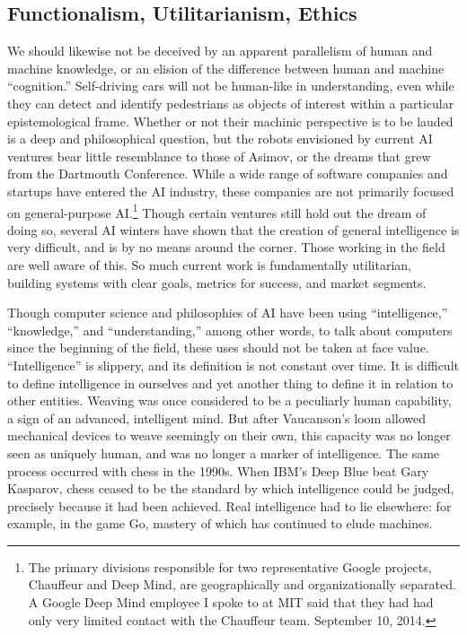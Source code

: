 \subsection{Functionalism, Utilitarianism, Ethics} 
We should likewise not be deceived by an apparent parallelism of human
and machine knowledge, or an elision of the difference between human
and machine ``cognition.'' Self-driving cars will not be human-like in
understanding, even while they can detect and identify pedestrians as
objects of interest within a particular epistemological frame. Whether
or not their machinic perspective is to be lauded is a deep and
philosophical question, but the robots envisioned by current AI
ventures bear little resemblance to those of Asimov, or the dreams that grew
from the Dartmouth Conference. While a wide range of software companies and
startups have entered the AI 
industry, these companies are not primarily focused on
general-purpose AI.\footnote{The primary divisions responsible for two
representative Google projects, Chauffeur and Deep Mind, are
geographically and organizationally separated. A Google Deep Mind
employee I spoke to at MIT said that they had had only very limited
contact with the Chauffeur team. September 10, 2014.} Though certain
ventures still hold out the dream 
of doing so, several AI winters have shown that the creation of
general intelligence is very difficult, and is by no means around the
corner. Those working in the field are well aware of
this.\cite{???-articlerebuttingmusk-http://www.popsci.com/bill-gates-fears-ai-ai-researchers-know-better?cmpid=currents} So much current work is
fundamentally utilitarian, building systems with clear goals, metrics
for success, and market segments.

Though computer science and philosophies of AI have been using
``intelligence,'' ``knowledge,'' and ``understanding,'' among other
words, to talk about computers since the beginning of the field, these
uses should not be taken at face value. ``Intelligence'' is slippery,
and its definition is not constant over time. It is difficult to
define intelligence in ourselves\cite{???} and yet another thing to define it
in relation to other entities. Weaving was once considered to be a
peculiarly human capability, a sign of an advanced, intelligent
mind.\cite{???} But after Vaucanson's loom allowed mechanical devices to weave
seemingly on their own, this capacity was no longer seen as uniquely
human, and was no longer a marker of intelligence. The same process
occurred with chess in the 1990s. When IBM's Deep Blue beat Gary
Kasparov, chess ceased to be the standard by which intelligence could
be judged, precisely because it had been achieved. Real intelligence
had to lie elsewhere: for example, in the game Go, mastery of which
has continued to elude machines.\cite{???}

